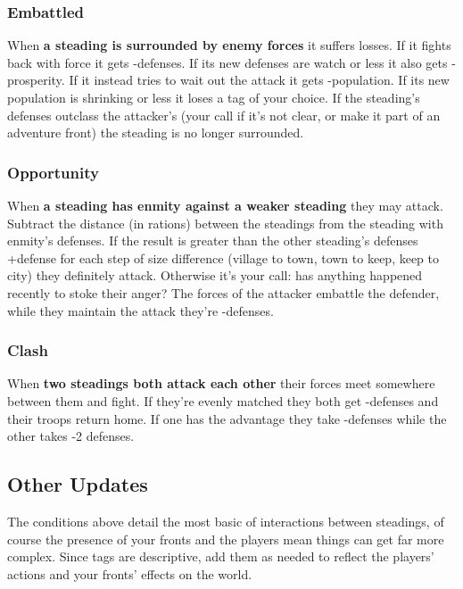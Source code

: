 \subsubsection{Embattled}


When \textbf{a steading is surrounded by enemy forces}
it suffers losses. If it fights back with force it gets -defenses. If its new defenses are watch or less it also gets -prosperity. If it instead tries to wait out the attack it gets -population. If its new population is shrinking or less it loses a tag of your choice. If the steading's defenses outclass the attacker's (your call if it's not clear, or make it part of an adventure front) the steading is no longer surrounded.
\subsubsection{Opportunity}


When \textbf{a steading has enmity against a weaker steading}
they may attack. Subtract the distance (in rations) between the steadings from the steading with enmity's defenses. If the result is greater than the other steading's defenses +defense for each step of size difference (village to town, town to keep, keep to city) they definitely attack. Otherwise it's your call: has anything happened recently to stoke their anger? The forces of the attacker embattle the defender, while they maintain the attack they're -defenses.
\subsubsection{Clash}


When \textbf{two steadings both attack each other}
their forces meet somewhere between them and fight. If they're evenly matched they both get -defenses and their troops return home. If one has the advantage they take -defenses while the other takes -2 defenses.
\subsection{Other Updates}


The conditions above detail the most basic of interactions between steadings, of course the presence of your fronts and the players mean things can get far more complex. Since tags are descriptive, add them as needed to reflect the players' actions and your fronts' effects on the world.


